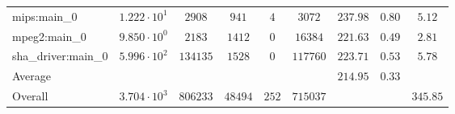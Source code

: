 \begin{tabular}{|l|c|c|c|c|c|c|c|c|}
mips:main\_0            & $ 1.222 \cdot 10^{1}  $ & $ 2908   $ & $ 941   $ & $ 4   $ & $ 3072   $ & $ 237.98      $ & $ 0.80    $ & $ 5.12    $ \\
mpeg2:main\_0           & $ 9.850 \cdot 10^{0}  $ & $ 2183   $ & $ 1412  $ & $ 0   $ & $ 16384  $ & $ 221.63      $ & $ 0.49    $ & $ 2.81    $ \\
sha\_driver:main\_0     & $ 5.996 \cdot 10^{2}  $ & $ 134135 $ & $ 1528  $ & $ 0   $ & $ 117760 $ & $ 223.71      $ & $ 0.53    $ & $ 5.78    $ \\
\hline
Average                 & $                     $ & $        $ & $       $ & $     $ & $        $ & $ 214.95      $ & $ 0.33    $ & $         $ \\
\hline
Overall                 & $ 3.704 \cdot 10^{3}  $ & $ 806233 $ & $ 48494 $ & $ 252 $ & $ 715037 $ & $             $ & $         $ & $ 345.85  $ \\
\hline
\end{tabular}
